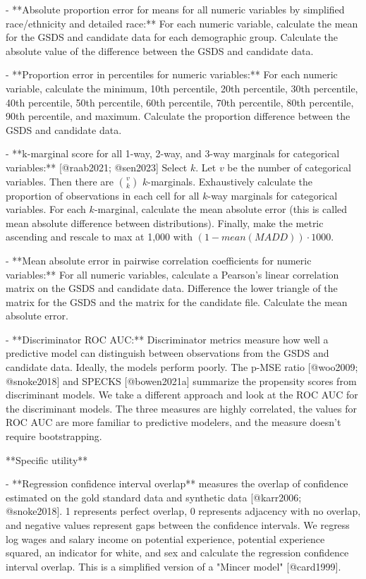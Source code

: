 -   **Absolute proportion error for means for all numeric variables by simplified race/ethnicity and detailed race:** For each numeric variable, calculate the mean for the GSDS and candidate data for each demographic group. Calculate the absolute value of the difference between the GSDS and candidate data.

-   **Proportion error in percentiles for numeric variables:** For each numeric variable, calculate the minimum, 10th percentile, 20th percentile, 30th percentile, 40th percentile, 50th percentile, 60th percentile, 70th percentile, 80th percentile, 90th percentile, and maximum. Calculate the proportion difference between the GSDS and candidate data.

-   **k-marginal score for all 1-way, 2-way, and 3-way marginals for categorical variables:** [@raab2021; @sen2023] Select $k$. Let $v$ be the number of categorical variables. Then there are ${v \choose k}$ $k$-marginals. Exhaustively calculate the proportion of observations in each cell for all $k$-way marginals for categorical variables. For each $k$-marginal, calculate the mean absolute error (this is called mean absolute difference between distributions). Finally, make the metric ascending and rescale to max at 1,000 with $(1 - mean(MADD)) \cdot 1000$.

-   **Mean absolute error in pairwise correlation coefficients for numeric variables:** For all numeric variables, calculate a Pearson's linear correlation matrix on the GSDS and candidate data. Difference the lower triangle of the matrix for the GSDS and the matrix for the candidate file. Calculate the mean absolute error.

-   **Discriminator ROC AUC:** Discriminator metrics measure how well a predictive model can distinguish between observations from the GSDS and candidate data. Ideally, the models perform poorly. The p-MSE ratio [@woo2009; @snoke2018] and SPECKS [@bowen2021a] summarize the propensity scores from discriminant models. We take a different approach and look at the ROC AUC for the discriminant models. The three measures are highly correlated, the values for ROC AUC are more familiar to predictive modelers, and the measure doesn't require bootstrapping.

**Specific utility**

-   **Regression confidence interval overlap** measures the overlap of confidence estimated on the gold standard data and synthetic data [@karr2006; @snoke2018]. 1 represents perfect overlap, 0 represents adjacency with no overlap, and negative values represent gaps between the confidence intervals. We regress log wages and salary income on potential experience, potential experience squared, an indicator for white, and sex and calculate the regression confidence interval overlap. This is a simplified version of a "Mincer model" [@card1999].

